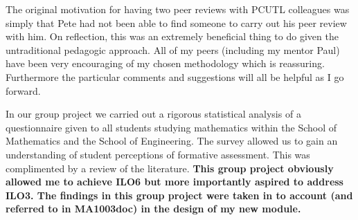 \documentclass{article}
\begin{document}
The original motivation for having two peer reviews with PCUTL colleagues was simply that Pete had not been able to find someone to carry out his peer review with him. On reflection, this was an extremely beneficial thing to do given the untraditional pedagogic approach.  All of my peers (including my mentor Paul) have been very encouraging of my chosen methodology which is reassuring. Furthermore the particular comments and suggestions will all be helpful as I go forward.

In our group project we carried out a rigorous statistical analysis of a questionnaire given to all students studying mathematics within the School of Mathematics and the School of Engineering. The survey allowed us to gain an understanding of student perceptions of formative assessment. This was complimented by a review of the literature. \textbf{This group project obviously allowed me to achieve ILO6 but more importantly aspired to address ILO3. The findings in this group project were taken in to account (and referred to in MA1003doc) in the design of my new module.}
\end{document}
